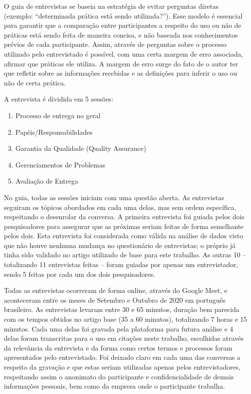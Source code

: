 O guia de entrevistas se baseia na estratégia de evitar perguntas diretas (exemplo: “determinada prática está sendo utilizada?”). Esse modelo é essencial para garantir que a comparação entre participantes a respeito do uso ou não de práticas está sendo feita de maneira concisa, e não baseada nos conhecimentos prévios de cada participante. Assim, através de perguntas sobre o processo utilizado pelo entrevistado é possível, com uma certa margem de erro associada, afirmar que práticas ele utiliza. A margem de erro surge do fato de o autor ter que refletir sobre as informações recebidas e as definições para inferir o uso ou não de certa prática.

A entrevista é dividida em 5 sessões: 

\begin{enumerate}
\item Processo de entrega no geral
\item Papéis/Responsabilidades
\item Garantia da Qualidade (Quality Assurance)
\item Gerenciamentos de Problemas
\item Avaliação de Entrega
\end{enumerate}

No guia, todas as sessões iniciam com uma questão aberta. As entrevistas seguiram os tópicos abordados em cada uma delas, mas sem ordem específica, respeitando o desenrolar da conversa. A primeira entrevista foi guiada pelos dois pesquisadores para assegurar que as próximas seriam feitas de forma semelhante pelos dois. Esta entrevista foi considerada como válida na análise de dados visto que não houve nenhuma mudança no questionário de entrevistas; o próprio já tinha sido validado no artigo utilizado de base para este trabalho. As outras 10 -- totalizando 11 entrevistas feitas -- foram guiadas por apenas um entrevistador, sendo 5 feitas por cada um dos dois pesquisadores.

Todas as entrevistas ocorreram de forma online, através do Google Meet, e aconteceram entre os meses de Setembro e Outubro de 2020 em português brasileiro. As entrevistas levaram entre 30 e 65 minutos, duração bem parecida com os tempos obtidos no artigo base (35 a 60 minutos), totalizando 7 horas e 15 minutos. Cada uma delas foi gravada pela plataforma para futura análise e 4 delas foram transcritas para o uso em citações neste trabalho, escolhidas através da relevância da entrevista e da forma como certos termos e processos foram apresentados pelo entrevistado. Foi deixado claro em cada uma das conversas a respeito da gravação e que estas seriam utilizadas apenas pelos entrevistadores, respeitando assim o anonimato do participante e confidencialidade de demais informações pessoais, bem como da empresa onde o participante trabalha.

